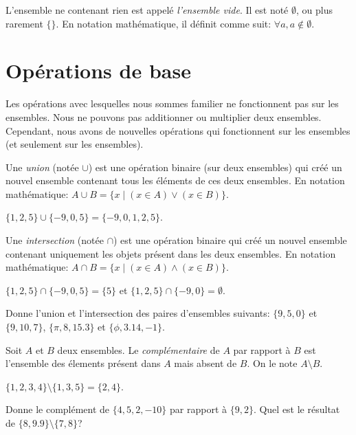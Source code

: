 \begin{definition}
    L'ensemble ne contenant rien est appelé \emph{l'ensemble vide}. Il est noté $\emptyset$, ou plus rarement $\{\}$. En notation mathématique, il définit comme suit: $\forall a, a\not\in \emptyset$.
\end{definition}

\section{Opérations de base}

Les opérations avec lesquelles nous sommes familier ne fonctionnent pas sur les ensembles. Nous ne pouvons pas additionner ou multiplier deux ensembles. Cependant, nous avons de nouvelles opérations qui fonctionnent sur les ensembles (et seulement sur les ensembles).

\begin{definition}
    Une \emph{union} (notée $\cup$) est une opération binaire (sur deux ensembles) qui créé un nouvel ensemble contenant tous les éléments de ces deux ensembles. En notation mathématique: $A \cup B = \{x \mid (x\in A) \vee (x\in B)\}$.
\end{definition}

\begin{exemple}
    $\{1, 2, 5\} \cup \{-9, 0, 5\} = \{-9, 0, 1, 2, 5\}$.
\end{exemple}

\begin{definition}
    Une \emph{intersection} (notée $\cap$) est une opération binaire qui créé un nouvel ensemble contenant uniquement les objets présent dans les deux ensembles. En notation mathématique: $A \cap B = \{x\mid (x\in A) \wedge (x\in B) \}$.
\end{definition}

\begin{exemple}
    $\{1, 2, 5\} \cap \{-9, 0, 5\} = \{5\}$ et $\{1, 2, 5\} \cap \{-9, 0\} = \emptyset$.
\end{exemple}

\begin{exercice}
    Donne l'union et l'intersection des paires d'ensembles suivants: $\{9, 5, 0\}$ et $\{9, 10, 7\}$, $\{\pi, 8, 15.3\}$ et $\{\phi, 3.14, -1\}$.
\end{exercice}

\begin{definition}
    Soit $A$ et $B$ deux ensembles. Le \emph{complémentaire} de $A$ par rapport à $B$ est l'ensemble des élements présent dans $A$ mais absent de $B$. On le note $A\setminus B$.
\end{definition}

\begin{exemple}
    $\{1, 2, 3, 4\} \setminus \{1, 3, 5\} = \{2, 4\}$.
\end{exemple}

\begin{exercice}
    Donne le complément de $\{4, 5, 2, -10\}$ par rapport à $\{9, 2\}$. Quel est le résultat de $\{8, 9.9\} \setminus \{7, 8\}$?
\end{exercice}
